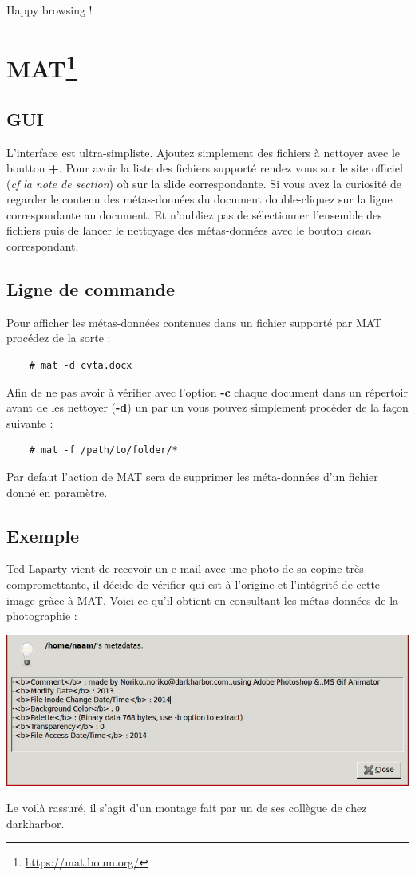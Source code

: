 \documentclass[a4paper]{article}
\begin{document}
Happy browsing !

\section{MAT\protect\footnote{\url{https://mat.boum.org/}}}

\subsection{GUI}

L'interface est ultra-simpliste. Ajoutez simplement des fichiers à nettoyer
avec le boutton \textbf{+}. Pour avoir la liste des fichiers supporté rendez vous sur le
site officiel (\emph{cf la note de section}) où sur la slide correspondante.
Si vous avez la curiosité de regarder le contenu des métas-données du document
double-cliquez sur la ligne correspondante au document. Et n'oubliez pas de
sélectionner l'ensemble des fichiers puis de lancer le nettoyage des métas-données
avec le bouton \emph{clean} correspondant.

\subsection{Ligne de commande}

Pour afficher les métas-données contenues dans un fichier supporté par \textsc{MAT}
procédez de la sorte :
\begin{verbatim}
    # mat -d cvta.docx
\end{verbatim}

Afin de ne pas avoir à vérifier avec l'option \textbf{-c} chaque document dans un répertoir
avant de les nettoyer (\textbf{-d}) un par un vous pouvez simplement procéder
de la façon suivante :

\begin{verbatim}
    # mat -f /path/to/folder/*
\end{verbatim}

Par defaut l'action de \textsc{MAT} sera de supprimer les méta-données d'un fichier
donné en paramètre.

\subsection{Exemple}
Ted Laparty vient de recevoir un e-mail avec une photo de sa copine très compromettante,
il décide de vérifier qui est à l'origine et l'intégrité de cette image gràce à
\textsc{MAT}. Voici ce qu'il obtient en consultant les métas-données de la photographie :\\
\begin{center}
    \includegraphics[width=.7\textwidth]{./materials/dirty}
        \end{center}
Le voilà rassuré, il s'agit d'un montage fait par un de ses collègue de chez darkharbor.
\newpage
\end{document}
